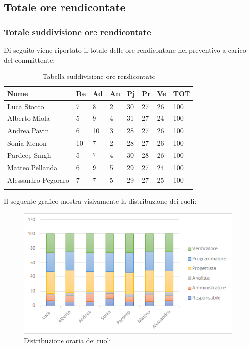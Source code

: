 \subsection{Totale ore rendicontate}
\subsubsection{Totale suddivisione ore rendicontate}
Di seguito viene riportato il totale delle ore rendicontane nel preventivo a carico del committente:
\begin{center}
	\renewcommand{\arraystretch}{1.5}
	\begin{longtable}[H]{ p{3.5cm}  p{1.2cm} p{1.2cm}  p{1.2cm} p{1.2cm}  p{1.2cm} p{1.2cm}  p{1.4cm}  }
		\rowcolor{tableHeadYellow}
		\textbf{Nome}   & \textbf{Re} & \textbf{Ad} & \textbf{An} & \textbf{Pj} & \textbf{Pr} & \textbf{Ve} & \textbf{TOT} \\ 
		\endhead
		Luca Stocco       & 7   & 8    & 2   & 30   & 27    & 26   &   100 \\  
		Alberto Miola     & 5   & 9     & 4   & 31   & 27    & 24   &   100 \\  
		Andrea Pavin      & 6   & 10    & 3   & 28   & 27    & 26   &   100 \\  
		Sonia Menon       & 10  & 7     & 2   & 28   & 27    & 26   &   100 \\  
		Pardeep Singh     & 5   & 7     & 4   & 30   & 28    & 26   &   100 \\  
		Matteo Pellanda   & 6   & 9     & 5   & 29   & 27    & 24   &   100 \\
		Alessandro Pegoraro & 7 & 7		& 5	  & 29	 & 27 	& 25 	& 100\\   
		\rowcolor{white}
		\caption{Tabella suddivisione ore rendicontate}
	\end{longtable}
\end{center}
Il seguente grafico mostra visivamente la distribuzione dei ruoli:
\begin{figure}[H]
	\centering
	\includegraphics[width=15cm,keepaspectratio]{../includes/pics/grafici/grafico11.png}
	\caption{\label{fig:mission}Distribuzione oraria dei ruoli}
\end{figure}
\clearpage
